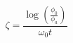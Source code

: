 \begin{equation} \label{eq:xeta_equation}
\zeta = \frac{\log{\left(\frac{\phi_{0}}{\phi_{a}} \right)}}{\omega_{0} t}
\end{equation}
